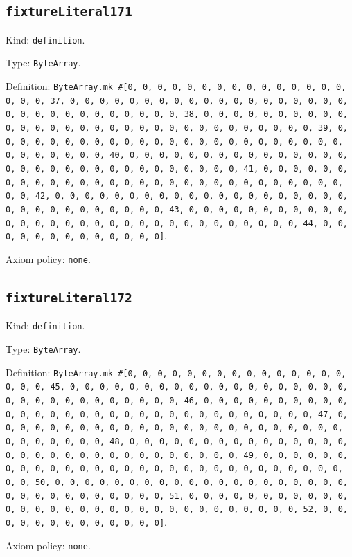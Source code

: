 \documentclass[11pt]{article}
\begin{document}
\subsection*{\texttt{fixtureLiteral171}}
\noindent Kind: \texttt{definition}.\par
\noindent Type: \texttt{ByteArray}.\par
\noindent Definition: \texttt{ByteArray.mk \#[0, 0, 0, 0, 0, 0, 0, 0, 0, 0, 0, 0, 0, 0, 0, 0, 0, 0, 37, 0, 0, 0, 0, 0, 0, 0, 0, 0, 0, 0, 0, 0, 0, 0, 0, 0, 0, 0, 0, 0, 0, 0, 0, 0, 0, 0, 0, 0, 0, 0, 38, 0, 0, 0, 0, 0, 0, 0, 0, 0, 0, 0, 0, 0, 0, 0, 0, 0, 0, 0, 0, 0, 0, 0, 0, 0, 0, 0, 0, 0, 0, 0, 39, 0, 0, 0, 0, 0, 0, 0, 0, 0, 0, 0, 0, 0, 0, 0, 0, 0, 0, 0, 0, 0, 0, 0, 0, 0, 0, 0, 0, 0, 0, 0, 40, 0, 0, 0, 0, 0, 0, 0, 0, 0, 0, 0, 0, 0, 0, 0, 0, 0, 0, 0, 0, 0, 0, 0, 0, 0, 0, 0, 0, 0, 0, 0, 41, 0, 0, 0, 0, 0, 0, 0, 0, 0, 0, 0, 0, 0, 0, 0, 0, 0, 0, 0, 0, 0, 0, 0, 0, 0, 0, 0, 0, 0, 0, 0, 42, 0, 0, 0, 0, 0, 0, 0, 0, 0, 0, 0, 0, 0, 0, 0, 0, 0, 0, 0, 0, 0, 0, 0, 0, 0, 0, 0, 0, 0, 0, 0, 43, 0, 0, 0, 0, 0, 0, 0, 0, 0, 0, 0, 0, 0, 0, 0, 0, 0, 0, 0, 0, 0, 0, 0, 0, 0, 0, 0, 0, 0, 0, 0, 44, 0, 0, 0, 0, 0, 0, 0, 0, 0, 0, 0, 0, 0]}.\par
\noindent Axiom policy: \texttt{none}.\par
\subsection*{\texttt{fixtureLiteral172}}
\noindent Kind: \texttt{definition}.\par
\noindent Type: \texttt{ByteArray}.\par
\noindent Definition: \texttt{ByteArray.mk \#[0, 0, 0, 0, 0, 0, 0, 0, 0, 0, 0, 0, 0, 0, 0, 0, 0, 0, 45, 0, 0, 0, 0, 0, 0, 0, 0, 0, 0, 0, 0, 0, 0, 0, 0, 0, 0, 0, 0, 0, 0, 0, 0, 0, 0, 0, 0, 0, 0, 0, 46, 0, 0, 0, 0, 0, 0, 0, 0, 0, 0, 0, 0, 0, 0, 0, 0, 0, 0, 0, 0, 0, 0, 0, 0, 0, 0, 0, 0, 0, 0, 0, 47, 0, 0, 0, 0, 0, 0, 0, 0, 0, 0, 0, 0, 0, 0, 0, 0, 0, 0, 0, 0, 0, 0, 0, 0, 0, 0, 0, 0, 0, 0, 0, 48, 0, 0, 0, 0, 0, 0, 0, 0, 0, 0, 0, 0, 0, 0, 0, 0, 0, 0, 0, 0, 0, 0, 0, 0, 0, 0, 0, 0, 0, 0, 0, 49, 0, 0, 0, 0, 0, 0, 0, 0, 0, 0, 0, 0, 0, 0, 0, 0, 0, 0, 0, 0, 0, 0, 0, 0, 0, 0, 0, 0, 0, 0, 0, 50, 0, 0, 0, 0, 0, 0, 0, 0, 0, 0, 0, 0, 0, 0, 0, 0, 0, 0, 0, 0, 0, 0, 0, 0, 0, 0, 0, 0, 0, 0, 0, 51, 0, 0, 0, 0, 0, 0, 0, 0, 0, 0, 0, 0, 0, 0, 0, 0, 0, 0, 0, 0, 0, 0, 0, 0, 0, 0, 0, 0, 0, 0, 0, 52, 0, 0, 0, 0, 0, 0, 0, 0, 0, 0, 0, 0, 0]}.\par
\noindent Axiom policy: \texttt{none}.\par
\end{document}
